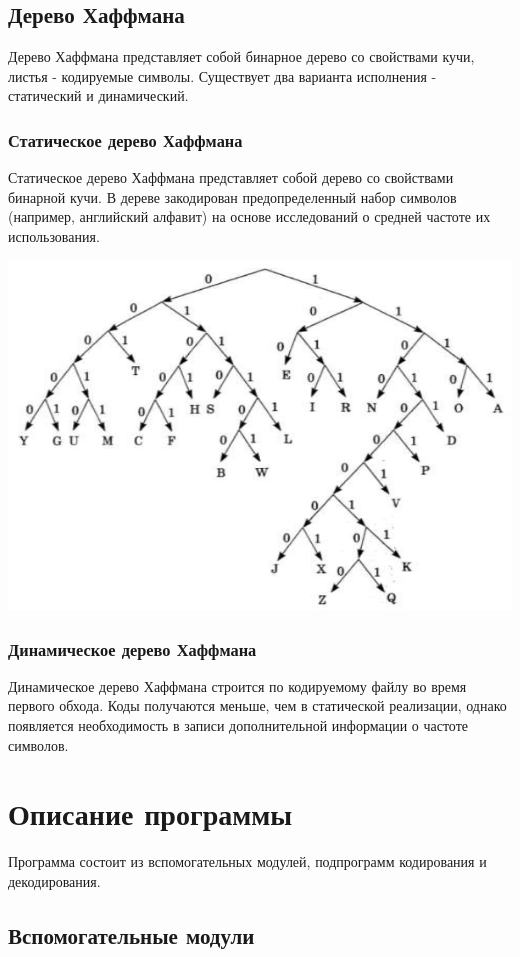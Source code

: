 \documentclass[12pt, a4paper]{article}
\begin{document}
\subsection{Дерево Хаффмана}
Дерево Хаффмана представляет собой бинарное дерево со свойствами кучи, листья -
кодируемые символы.
Существует два варианта исполнения - статический и динамический.
\subsubsection{Статическое дерево Хаффмана}
Статическое дерево Хаффмана представляет собой дерево со свойствами
бинарной кучи. В дереве закодирован предопределенный набор символов
(например, английский алфавит) на основе исследований о средней
частоте их использования.
\vspace{3mm}
\begin{center}
\includegraphics[scale=0.5]{tree.png}
\end{center}
\subsubsection{Динамическое дерево Хаффмана}
Динамическое дерево Хаффмана строится по кодируемому файлу во время
первого обхода. Коды получаются меньше, чем в статической реализации, однако
появляется необходимость в записи дополнительной информации о частоте символов.

\section{Описание программы}
Программа состоит из вспомогательных модулей, подпрограмм
кодирования и декодирования.
\subsection{Вспомогательные модули}
\end{document}
